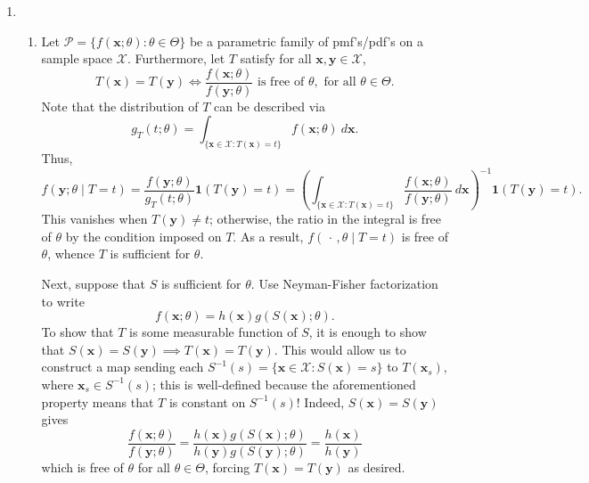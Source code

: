 \documentclass[11pt]{article}
\begin{document}
\begin{enumerate}
        \item
        \begin{enumerate}
            \item Let $\mathcal{P} = \{f(\bm{x}; \theta)\colon \theta \in
            \Theta\}$ be a parametric family of pmf's/pdf's on a sample space
            $\mathcal{X}$.
            Furthermore, let $T$ satisfy for all $\bm{x}, \bm{y} \in
            \mathcal{X}$, \[
                T(\bm{x}) = T(\bm{y}) \iff \frac{f(\bm{x}; \theta)}{f(\bm{y}; \theta)}\text{ is free of }\theta, \text{ for all }\theta \in \Theta.
            \] Note that the distribution of $T$ can be described via \[
                g_T(t; \theta) = \int_{\{\bm{x} \in \mathcal{X}\colon T(\bm{x}) = t\}} f(\bm{x}; \theta)\:d\bm{x}.
            \] Thus, \[
                f(\bm{y}; \theta \mid T = t)
                    = \frac{f(\bm{y}; \theta)}{g_T(t; \theta)} \bm{1}(T(\bm{y}) = t)
                    = \left(\int_{\{\bm{x} \in \mathcal{X}\colon T(\bm{x}) = t\}} \frac{f(\bm{x}; \theta)}{f(\bm{y}; \theta)}\:d\bm{x}\right)^{-1} \bm{1}(T(\bm{y}) = t).
            \] This vanishes when $T(\bm{y}) \neq t$; otherwise, the ratio in
            the integral is free of $\theta$ by the condition imposed on $T$.
            As a result, $f(\,\cdot\,, \theta\mid T = t)$ is free of $\theta$,
            whence $T$ is sufficient for $\theta$.

            Next, suppose that $S$ is sufficient for $\theta$.
            Use Neyman-Fisher factorization to write \[
                f(\bm{x}; \theta) = h(\bm{x}) g(S(\bm{x}); \theta).
            \] To show that $T$ is some measurable function of $S$, it is
            enough to show that $S(\bm{x}) = S(\bm{y}) \implies T(\bm{x}) =
            T(\bm{y})$.
            This would allow us to construct a map sending each $S^{-1}(s) =
            \{\bm{x} \in \mathcal{X}\colon S(\bm{x}) = s\}$ to $T(\bm{x}_s)$,
            where $\bm{x}_s \in S^{-1}(s)$; this is well-defined because the
            aforementioned property means that $T$ is constant on $S^{-1}(s)$!
            Indeed, $S(\bm{x}) = S(\bm{y})$ gives \[
                \frac{f(\bm{x}; \theta)}{f(\bm{y}; \theta)} = \frac{h(\bm{x}) g(S(\bm{x}); \theta)}{h(\bm{y}) g(S(\bm{y}); \theta)} = \frac{h(\bm{x})}{h(\bm{y})}
            \] which is free of $\theta$ for all $\theta \in \Theta$, forcing
            $T(\bm{x}) = T(\bm{y})$ as desired.



\end{enumerate}
\end{enumerate}
\end{document}
